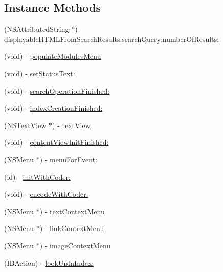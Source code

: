 \subsection*{Instance Methods}
\begin{DoxyCompactItemize}
\item 
(N\-S\-Attributed\-String $\ast$) -\/ \hyperlink{interface_module_view_controller_a9b8719aea240bb6d9e12ea0078eb34ec}{displayable\-H\-T\-M\-L\-From\-Search\-Results\-:search\-Query\-:number\-Of\-Results\-:}
\item 
(void) -\/ \hyperlink{interface_module_view_controller_af93fa75282ae196249c4a08e8845fb8f}{populate\-Modules\-Menu}
\item 
(void) -\/ \hyperlink{interface_module_view_controller_a86f5fa035efb2e0d568cf4cf9e621358}{set\-Status\-Text\-:}
\item 
(void) -\/ \hyperlink{interface_module_view_controller_aebe8aa693a307d7f2cab428e8cc8572f}{search\-Operation\-Finished\-:}
\item 
(void) -\/ \hyperlink{interface_module_view_controller_affce1dc00566ecfbdaa29a5c204ea414}{index\-Creation\-Finished\-:}
\item 
(N\-S\-Text\-View $\ast$) -\/ \hyperlink{interface_module_view_controller_aa04c518654a720c5d33543c1f6907669}{text\-View}
\item 
(void) -\/ \hyperlink{interface_module_view_controller_a14ea82a054bc45c1a1c62bb7f6985da2}{content\-View\-Init\-Finished\-:}
\item 
(N\-S\-Menu $\ast$) -\/ \hyperlink{interface_module_view_controller_a14434144f47d2ff967d87e42abbff1d8}{menu\-For\-Event\-:}
\item 
(id) -\/ \hyperlink{interface_module_view_controller_a6cf57c30ef62d8a0b74eafd74d0f8b39}{init\-With\-Coder\-:}
\item 
(void) -\/ \hyperlink{interface_module_view_controller_a958c5e82e2f22a1a132161999b5d1704}{encode\-With\-Coder\-:}
\item 
(N\-S\-Menu $\ast$) -\/ \hyperlink{interface_module_view_controller_ab3a24e21a58c1e870eb4d2b6380d7a72}{text\-Context\-Menu}
\item 
(N\-S\-Menu $\ast$) -\/ \hyperlink{interface_module_view_controller_a0bbefe9238ed181dcad8bbff9a3ee994}{link\-Context\-Menu}
\item 
(N\-S\-Menu $\ast$) -\/ \hyperlink{interface_module_view_controller_a638510d39068d3fda16c07822afeafbf}{image\-Context\-Menu}
\item 
(I\-B\-Action) -\/ \hyperlink{interface_module_view_controller_a4a49d07d887f1925ad6444192089c725}{look\-Up\-In\-Index\-:}

\end{DoxyCompactItemize}
